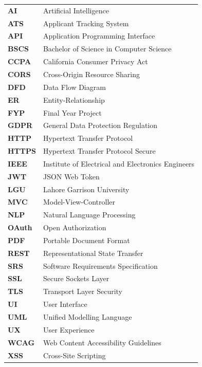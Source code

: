 \documentclass[12pt, a4paper, oneside]{report}
\begin{document}
\begin{tabular}{ll}
  \textbf{AI}     & Artificial Intelligence \\
  \textbf{ATS}    & Applicant Tracking System \\
  \textbf{API}    & Application Programming Interface \\
  \textbf{BSCS}   & Bachelor of Science in Computer Science \\
  \textbf{CCPA}   & California Consumer Privacy Act \\
  \textbf{CORS}   & Cross-Origin Resource Sharing \\
  \textbf{DFD}    & Data Flow Diagram \\
  \textbf{ER}     & Entity-Relationship \\
  \textbf{FYP}    & Final Year Project \\
  \textbf{GDPR}   & General Data Protection Regulation \\
  \textbf{HTTP}   & Hypertext Transfer Protocol \\
  \textbf{HTTPS}  & Hypertext Transfer Protocol Secure \\
  \textbf{IEEE}   & Institute of Electrical and Electronics Engineers \\
  \textbf{JWT}    & JSON Web Token \\
  \textbf{LGU}    & Lahore Garrison University \\
  \textbf{MVC}    & Model-View-Controller \\
  \textbf{NLP}    & Natural Language Processing \\
  \textbf{OAuth}  & Open Authorization \\
  \textbf{PDF}    & Portable Document Format \\
  \textbf{REST}   & Representational State Transfer \\
  \textbf{SRS}    & Software Requirements Specification \\
  \textbf{SSL}    & Secure Sockets Layer \\
  \textbf{TLS}    & Transport Layer Security \\
  \textbf{UI}     & User Interface \\
  \textbf{UML}    & Unified Modelling Language \\
  \textbf{UX}     & User Experience \\
  \textbf{WCAG}   & Web Content Accessibility Guidelines \\
  \textbf{XSS}    & Cross-Site Scripting \\
\end{tabular}
\end{document}
